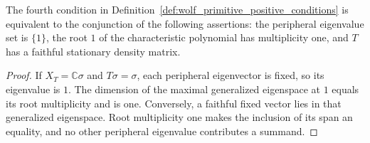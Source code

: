 \begin{theorem}
    \label{thm:wolf_peripheral_line_multiplicity}
    \leanok
    The fourth condition in Definition~\ref{def:wolf_primitive_positive_conditions}
    is equivalent to the conjunction of the following assertions: the peripheral
    eigenvalue set is $\{1\}$, the root $1$ of the characteristic polynomial
    has multiplicity one, and $T$ has a faithful stationary density matrix.
\end{theorem}
\begin{proof}\leanok
    If $X_T=\mathbb C\sigma$ and $T\sigma=\sigma$, each peripheral
    eigenvector is fixed, so its eigenvalue is $1$. The dimension of the
    maximal generalized eigenspace at $1$ equals its root multiplicity and
    is one. Conversely, a faithful fixed vector lies in that generalized
    eigenspace. Root multiplicity one makes the inclusion of its span an
    equality, and no other peripheral eigenvalue contributes a summand.
\end{proof}

